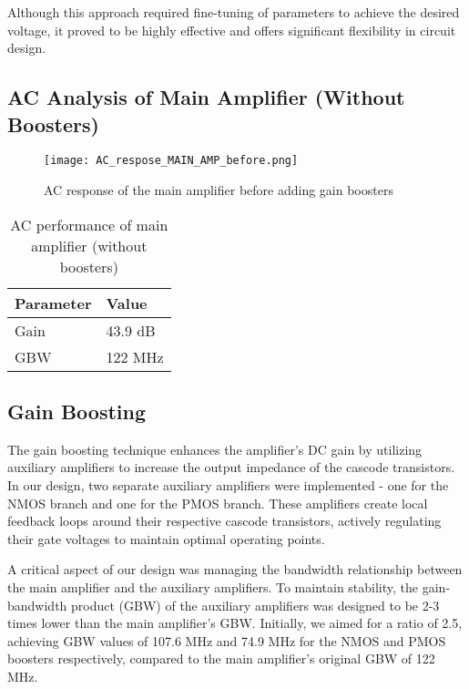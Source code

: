 \documentclass[a4paper,12pt]{article}
\begin{document}
Although this approach required fine-tuning of parameters to achieve the desired voltage, it proved to be highly effective and offers significant flexibility in circuit design.


\subsection{AC Analysis of Main Amplifier (Without Boosters)}
\begin{figure}[H]
    \centering
    \texttt{[image: AC\_respose\_MAIN\_AMP\_before.png]}
    \caption{AC response of the main amplifier before adding gain boosters}
    \label{fig:ac_main_before}
\end{figure}

\begin{table}[h]
    \centering
    \begin{tabular}{ll}
        \toprule
        Parameter & Value \\
        \midrule
        Gain & 43.9 dB \\
        GBW & 122 MHz \\
        \bottomrule
    \end{tabular}
    \caption{AC performance of main amplifier (without boosters)}
    \label{tab:ac_main_before}
\end{table}

\subsection{Gain Boosting}
The gain boosting technique enhances the amplifier's DC gain by utilizing auxiliary amplifiers to increase the output impedance of the cascode transistors. In our design, two separate auxiliary amplifiers were implemented - one for the NMOS branch and one for the PMOS branch. These amplifiers create local feedback loops around their respective cascode transistors, actively regulating their gate voltages to maintain optimal operating points.

A critical aspect of our design was managing the bandwidth relationship between the main amplifier and the auxiliary amplifiers. To maintain stability, the gain-bandwidth product (GBW) of the auxiliary amplifiers was designed to be 2-3 times lower than the main amplifier's GBW. Initially, we aimed for a ratio of 2.5, achieving GBW values of 107.6 MHz and 74.9 MHz for the NMOS and PMOS boosters respectively, compared to the main amplifier's original GBW of 122 MHz.
\end{document}
